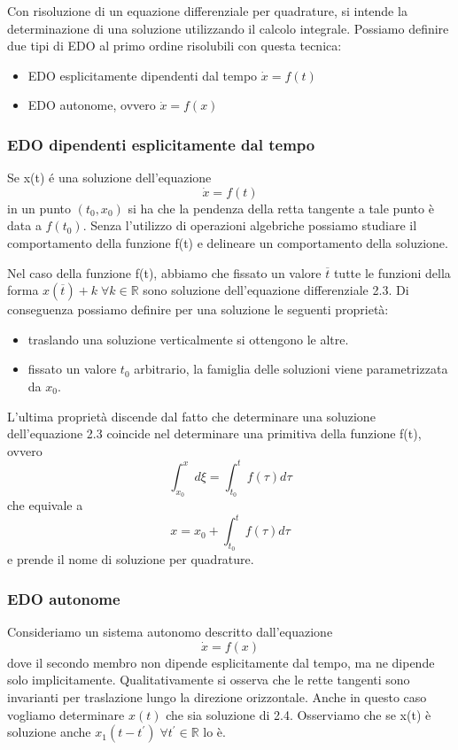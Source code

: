 Con risoluzione di un equazione differenziale per quadrature, si intende la determinazione di una soluzione utilizzando il calcolo integrale.
Possiamo definire due tipi di EDO al primo ordine risolubili con questa tecnica:
\begin{itemize}
	\item EDO esplicitamente dipendenti dal tempo $\dot{x} = f(t)$
	\item EDO autonome, ovvero $\dot{x} = f(x)$
\end{itemize}

\subsubsection{EDO dipendenti esplicitamente dal tempo}
Se x(t) \'{e} una soluzione dell'equazione 
\begin{equation}
	\dot{x} = f(t)
\end{equation}
in un punto $(t_0,x_0)$ si ha che la pendenza della retta tangente a tale punto \`{e} data a $f(t_0)$. Senza l'utilizzo di operazioni algebriche possiamo studiare il comportamento della funzione f(t) e delineare un comportamento della soluzione.

\noindent Nel caso della funzione f(t), abbiamo che fissato un valore $\overline{t}$ tutte le funzioni della forma $x(\overline{t}) + k \; \forall k \in \mathbb{R}$ sono soluzione dell'equazione differenziale 2.3. Di conseguenza possiamo definire per una soluzione le seguenti propriet\`{a}:
\begin{itemize}
	\item traslando una soluzione verticalmente si ottengono le altre.
	\item fissato un valore $t_0$ arbitrario, la famiglia delle soluzioni viene parametrizzata da $x_0$.
\end{itemize}
L'ultima propriet\`{a} discende dal fatto che determinare una soluzione dell'equazione 2.3 coincide nel determinare una primitiva della funzione f(t), ovvero
\begin{equation*}
	\int_{x_0}^x d\xi = \int_{t_0}^t f(\tau)d\tau
\end{equation*}
che equivale a 
\begin{equation*}
	x = x_0 + \int_{t_0}^{t} f(\tau) d\tau 
\end{equation*}
e prende il nome di soluzione per quadrature.

\subsubsection{EDO autonome}
Consideriamo un sistema autonomo descritto dall'equazione 
\begin{equation}
	\dot{x} = f(x)
\end{equation}
dove il secondo membro non dipende esplicitamente dal tempo, ma ne dipende solo implicitamente. Qualitativamente si osserva che le rette tangenti sono invarianti per traslazione lungo la direzione orizzontale. Anche in questo caso vogliamo determinare $x(t)$ che sia soluzione di 2.4. Osserviamo che se x(t) \`{e} soluzione anche $x_1(t-t^{\prime}) \; \forall t^{\prime} \in \mathbb{R}$ lo \`{e}. 
